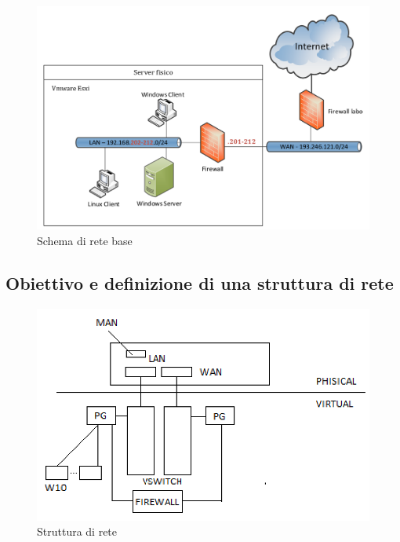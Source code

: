 \documentclass{article}
\begin{document}
\begin{figure}[H]
    \center
    \includegraphics[scale=0.3]{images/s2.png}
    \caption{Schema di rete base}\label{fig:1}
\end{figure}

\subsection{Obiettivo e definizione di una struttura di rete}

\begin{figure}[H]
    \center
    \includegraphics[scale=0.5]{images/lavagna.png}
    \caption{Struttura di rete}\label{fig:1}
\end{figure}
\end{document}
